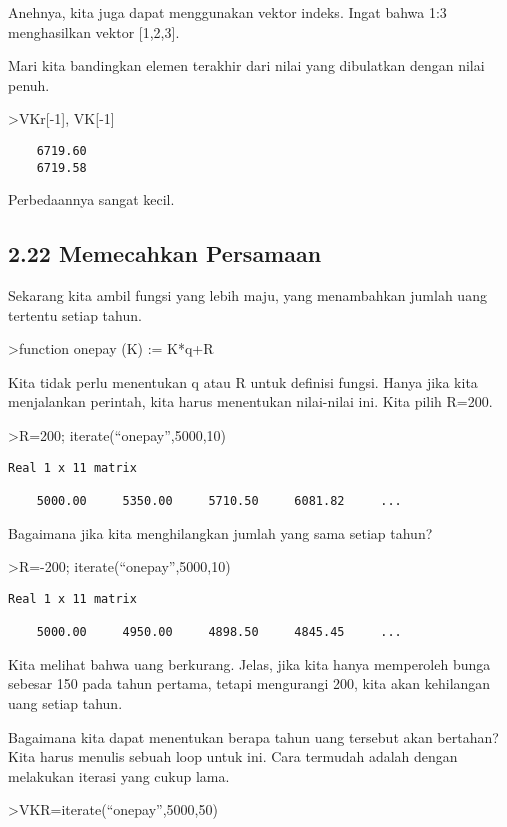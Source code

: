 \documentclass[
]{book}
\begin{document}
Anehnya, kita juga dapat menggunakan vektor indeks. Ingat bahwa 1:3 menghasilkan vektor {[}1,2,3{]}.

Mari kita bandingkan elemen terakhir dari nilai yang dibulatkan dengan nilai penuh.

\textgreater VKr{[}-1{]}, VK{[}-1{]}

\begin{verbatim}
    6719.60 
    6719.58 
\end{verbatim}

Perbedaannya sangat kecil.

\subsection{2.22 Memecahkan Persamaan}\label{memecahkan-persamaan}

Sekarang kita ambil fungsi yang lebih maju, yang menambahkan jumlah uang tertentu setiap tahun.

\textgreater function onepay (K) := K*q+R

Kita tidak perlu menentukan q atau R untuk definisi fungsi. Hanya jika kita menjalankan perintah, kita harus menentukan nilai-nilai ini. Kita pilih R=200.

\textgreater R=200; iterate(``onepay'',5000,10)

\begin{verbatim}
Real 1 x 11 matrix

    5000.00     5350.00     5710.50     6081.82     ...
\end{verbatim}

Bagaimana jika kita menghilangkan jumlah yang sama setiap tahun?

\textgreater R=-200; iterate(``onepay'',5000,10)

\begin{verbatim}
Real 1 x 11 matrix

    5000.00     4950.00     4898.50     4845.45     ...
\end{verbatim}

Kita melihat bahwa uang berkurang. Jelas, jika kita hanya memperoleh bunga sebesar 150 pada tahun pertama, tetapi mengurangi 200, kita akan kehilangan uang setiap tahun.

Bagaimana kita dapat menentukan berapa tahun uang tersebut akan bertahan? Kita harus menulis sebuah loop untuk ini. Cara termudah adalah dengan melakukan iterasi yang cukup lama.

\textgreater VKR=iterate(``onepay'',5000,50)
\end{document}
